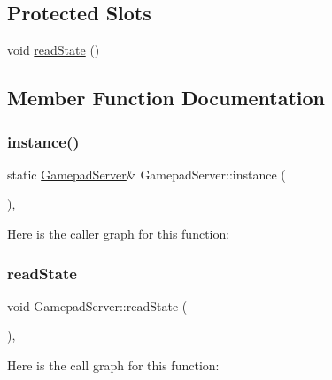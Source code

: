 \subsection*{Protected Slots}
\begin{DoxyCompactItemize}
\item 
void \mbox{\hyperlink{class_gamepad_server_a778ea9e920578ce470c09cbf9b2f29c8}{read\+State}} ()
\end{DoxyCompactItemize}


\subsection{Member Function Documentation}
\mbox{\label{class_gamepad_server_a18cc731027dd5f2b4a1879e1a8d37323}} 
\subsubsection{\texorpdfstring{instance()}{instance()}}
{\footnotesize\ttfamily static \mbox{\hyperlink{class_gamepad_server}{Gamepad\+Server}}\& Gamepad\+Server\+::instance (\begin{DoxyParamCaption}{ }\end{DoxyParamCaption})\hspace{0.3cm}{\ttfamily [inline]}, {\ttfamily [static]}}

Here is the caller graph for this function\+:
\mbox{\label{class_gamepad_server_a778ea9e920578ce470c09cbf9b2f29c8}} 
\subsubsection{\texorpdfstring{read\+State}{readState}}
{\footnotesize\ttfamily void Gamepad\+Server\+::read\+State (\begin{DoxyParamCaption}{ }\end{DoxyParamCaption})\hspace{0.3cm}{\ttfamily [protected]}, {\ttfamily [slot]}}

Here is the call graph for this function\+:
\mbox{\label{class_gamepad_server_a1f7b4b9ded7aa0d6982543e97cf05da0}} 
